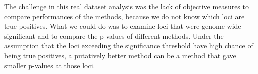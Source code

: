 \documentclass[11pt]{article}
\begin{document}
%











The challenge in this real dataset analysis was the lack of objective measures to compare
performances of the methods, 
because we do not know which loci are true positives.
What we could do was to examine loci that were genome-wide significant and to compare the p-values of different methods.
Under the assumption that the loci exceeding the significance threshold have high chance of being true positives,
a putatively better method can be a method that gave smaller p-values at those loci.
\end{document}
